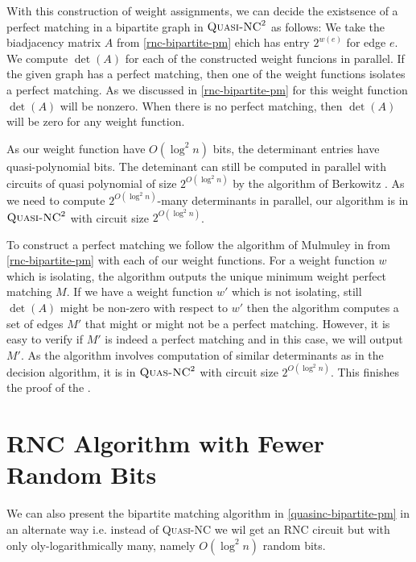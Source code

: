 With this construction of weight assignments, we can decide the existsence of a perfect matching in a bipartite graph in $\textsc{Quasi-NC}^2$ as follows: We take the biadjacency matrix $A$ from \autoref{rnc-bipartite-pm} ehich has entry $2^{w(e)}$ for edge $e$. We compute $\det(A)$ for each of the constructed weight funcions in parallel. If the given graph has a perfect matching, then one of the weight functions isolates a perfect matching. As we discussed in \autoref{rnc-bipartite-pm} for this weight function $\det(A)$ will be nonzero. When there is no perfect matching, then $\det(A)$ will be zero for any weight function.

As our weight function have $O(\log^2n)$ bits, the determinant entries have quasi-polynomial bits. The deteminant can still be computed in parallel with circuits of quasi polynomial of size $2^{O(\log^2 n)}$ by the algorithm of Berkowitz \cite{Berkowitz_1984_Oct}. As we need to compute $2^{O(\log^2n)}$-many determinants in parallel, our algorithm is in $\textsc{Quasi-NC}^2$ with circuit size $2^{O(\log^2 n)}$.

To construct a perfect matching we follow the algorithm of Mulmuley in \cite{MulmuleyVaziraniVazirani_1987_Mia_CONF} from \autoref{rnc-bipartite-pm} with each of our weight functions. For a weight function $w$ which is isolating, the algorithm outputs the unique minimum weight perfect matching $M$. If we have a weight function $w'$ which is not isolating, still $\det (A)$ might be non-zero  with respect to $w'$ then the algorithm computes a set of edges $M'$ that might or might not be a perfect matching. However, it is easy to verify if $M'$ is indeed a perfect matching and in this case, we will output $M'$. As the algorithm involves computation of similar determinants as in the decision algorithm, it is in $\textsc{Quas-NC}^2$ with circuit size $2^{O(\log ^2 n)}$. This finishes the proof of the .


\section{\textsc{RNC} Algorithm with Fewer Random Bits}
We can also present the bipartite matching algorithm in \autoref{quasinc-bipartite-pm} in an alternate way i.e. instead of \textsc{Quasi-NC} we wil get an \textsc{RNC} circuit but with only oly-logarithmically many, namely $O(\log^2 n)$ random bits.


